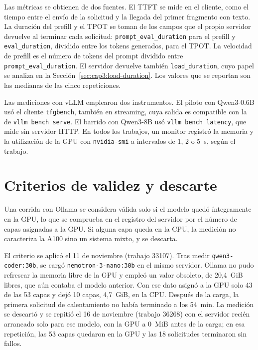 Las métricas se obtienen de dos fuentes. El TTFT se mide en el cliente, como el tiempo entre el envío de la solicitud y la llegada del primer fragmento con texto. La duración del prefill y el TPOT se toman de los campos que el propio servidor devuelve al terminar cada solicitud: \texttt{prompt\_eval\_duration} para el prefill y \texttt{eval\_duration}, dividido entre los tokens generados, para el TPOT. La velocidad de prefill es el número de tokens del prompt dividido entre \texttt{prompt\_eval\_duration}. El servidor devuelve también \texttt{load\_duration}, cuyo papel se analiza en la Sección~\ref{sec:cap3:load-duration}. Los valores que se reportan son las medianas de las cinco repeticiones.

Las mediciones con vLLM emplearon dos instrumentos. El piloto con Qwen3-0.6B usó el cliente \texttt{tfgbench}, también en streaming, cuya salida es compatible con la de \texttt{vllm bench serve}. El barrido con Qwen3-8B usó \texttt{vllm bench latency}, que mide sin servidor HTTP. En todos los trabajos, un monitor registró la memoria y la utilización de la GPU con \texttt{nvidia-smi} a intervalos de 1, 2 o 5~s, según el trabajo.

\section{Criterios de validez y descarte}
\label{sec:cap3:validez}

Una corrida con Ollama se considera válida solo si el modelo quedó íntegramente en la GPU, lo que se comprueba en el registro del servidor por el número de capas asignadas a la GPU. Si alguna capa queda en la CPU, la medición no caracteriza la A100 sino un sistema mixto, y se descarta.

El criterio se aplicó el 11 de noviembre (trabajo 33107). Tras medir \texttt{qwen3-\allowbreak coder:\allowbreak 30b}, se cargó \texttt{nemotron-3-\allowbreak nano:\allowbreak 30b} en el mismo servidor. Ollama no pudo refrescar la memoria libre de la GPU y empleó un valor obsoleto, de 20,4~GiB libres, que aún contaba el modelo anterior. Con ese dato asignó a la GPU solo 43 de las 53 capas y dejó 10 capas, 4,7~GiB, en la CPU. Después de la carga, la primera solicitud de calentamiento no había terminado a los 54~min. La medición se descartó y se repitió el 16 de noviembre (trabajo 36268) con el servidor recién arrancado solo para ese modelo, con la GPU a 0~MiB antes de la carga; en esa repetición, las 53 capas quedaron en la GPU y las 18 solicitudes terminaron sin fallos.

